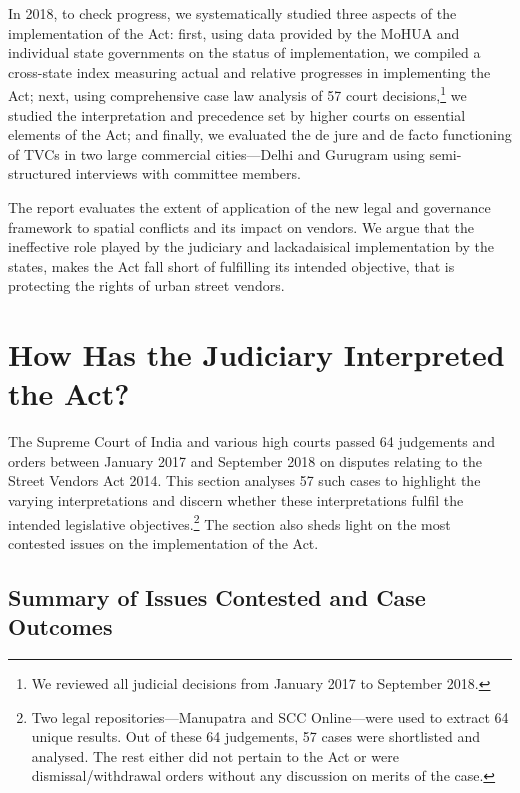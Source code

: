 \documentclass[a4paper, 12pt, twoside]{article}
\begin{document}
{In 2018, to check progress, we systematically studied three aspects of the implementation of the Act: first, using data provided by the MoHUA and individual state governments on the status of implementation, we compiled a cross-state index measuring actual and relative progresses in implementing the Act; next, using comprehensive case law analysis of 57 court decisions,\footnote{We reviewed all judicial decisions from January 2017 to September 2018.} we studied the interpretation and precedence set by higher courts on essential elements of the Act; and finally, we evaluated the de jure and de facto functioning of TVCs in two large commercial cities—Delhi and Gurugram using semi-structured interviews with committee members. 

The report evaluates the extent of application of the new legal and governance framework to spatial conflicts and its impact on vendors. We argue that the ineffective role played by the judiciary and lackadaisical implementation by the states, makes the Act fall short of fulfilling its intended objective, that is protecting the rights of urban street vendors. 

\section*{How Has the Judiciary Interpreted the Act?}

The Supreme Court of India and various high courts passed 64 judgements and orders between January 2017 and September 2018 on disputes relating to the Street Vendors Act 2014. This section analyses 57 such cases to highlight the varying interpretations and discern whether these interpretations fulfil the intended legislative objectives.\footnote{Two legal repositories—Manupatra and SCC Online—were used to extract 64 unique results. Out of these 64 judgements, 57 cases were shortlisted and analysed. The rest either did not pertain to the Act or were dismissal/withdrawal orders without any discussion on merits of the case.} The section also sheds light on the most contested issues on the implementation of the Act. 

\subsection*{Summary of Issues Contested and Case Outcomes}

}
\end{document}
